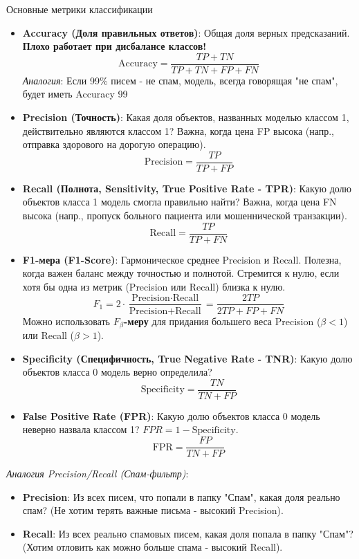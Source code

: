 \begin{textbox}{Основные метрики классификации}
    \begin{itemize}
        \item \textbf{Accuracy (Доля правильных ответов)}: Общая доля верных предсказаний. \textbf{Плохо работает при дисбалансе классов!}
            \[ \text{Accuracy} = \frac{TP + TN}{TP + TN + FP + FN} \]
            \textit{Аналогия}: Если 99\% писем - не спам, модель, всегда говорящая "не спам", будет иметь Accuracy 99%
        \item \textbf{Precision (Точность)}: Какая доля объектов, названных моделью классом 1, действительно являются классом 1? Важна, когда цена FP высока (напр., отправка здорового на дорогую операцию).
            \[ \text{Precision} = \frac{TP}{TP + FP} \]
        \item \textbf{Recall (Полнота, Sensitivity, True Positive Rate - TPR)}: Какую долю объектов класса 1 модель смогла правильно найти? Важна, когда цена FN высока (напр., пропуск больного пациента или мошеннической транзакции).
            \[ \text{Recall} = \frac{TP}{TP + FN} \]
        \item \textbf{F1-мера (F1-Score)}: Гармоническое среднее Precision и Recall. Полезна, когда важен баланс между точностью и полнотой. Стремится к нулю, если хотя бы одна из метрик (Precision или Recall) близка к нулю.
            \[ F_1 = 2 \cdot \frac{\text{Precision} \cdot \text{Recall}}{\text{Precision} + \text{Recall}} = \frac{2TP}{2TP + FP + FN} \]
            Можно использовать \textbf{$F_\beta$-меру} для придания большего веса Precision ($\beta < 1$) или Recall ($\beta > 1$).
        \item \textbf{Specificity (Специфичность, True Negative Rate - TNR)}: Какую долю объектов класса 0 модель верно определила?
             \[ \text{Specificity} = \frac{TN}{TN + FP} \]
        \item \textbf{False Positive Rate (FPR)}: Какую долю объектов класса 0 модель неверно назвала классом 1? $FPR = 1 - \text{Specificity}$.
            \[ \text{FPR} = \frac{FP}{TN + FP} \]
    \end{itemize}
    \textit{Аналогия Precision/Recall (Спам-фильтр)}:
    \begin{itemize}
        \item \textbf{Precision}: Из всех писем, что попали в папку "Спам", какая доля реально спам? (Не хотим терять важные письма - высокий Precision).
        \item \textbf{Recall}: Из всех реально спамовых писем, какая доля попала в папку "Спам"? (Хотим отловить как можно больше спама - высокий Recall).
    \end{itemize}
\end{textbox}

